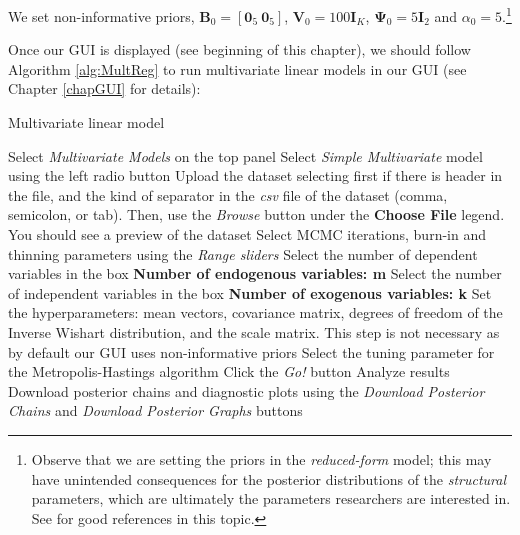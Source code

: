 We set non-informative priors, $\bm{B}_0=\left[\bm{0}_5 \ \bm{0}_5\right]$, $\bm{V}_0=100\bm{I}_K$, $\bm{\Psi}_0=5\bm{I}_2$ and $\alpha_0=5$.\footnote{Observe that we are setting the priors in the \textit{reduced-form} model; this may have unintended consequences for the posterior distributions of the \textit{structural} parameters, which are ultimately the parameters researchers are interested in. See \cite[p.~302]{koop2003bayesian} for good references in this topic.}  


Once our GUI is displayed (see beginning of this chapter), we should follow Algorithm \ref{alg:MultReg} to run multivariate linear models in our GUI (see Chapter \ref{chapGUI} for details):
\begin{algorithm}[h!]
	\caption{Multivariate linear model}\label{alg:MultReg}
	\begin{algorithmic}[1]  		 			
		\State Select \textit{Multivariate Models} on the top panel
		\State Select \textit{Simple Multivariate} model using the left radio button
		\State Upload the dataset selecting first if there is header in the file, and the kind of separator in the \textit{csv} file of the dataset (comma, semicolon, or tab). Then, use the \textit{Browse} button under the \textbf{Choose File} legend. You should see a preview of the dataset
		\State Select MCMC iterations, burn-in and thinning parameters using the \textit{Range sliders}
		\State Select the number of dependent variables in the box \textbf{Number of endogenous variables: m}
		\State Select the number of independent variables in the box \textbf{Number of exogenous variables: k}
		\State Set the hyperparameters: mean vectors, covariance matrix, degrees of freedom of the Inverse Wishart distribution, and the scale matrix. This step is not necessary as by default our GUI uses non-informative priors
		\State Select the tuning parameter for the Metropolis-Hastings algorithm
		\State Click the \textit{Go!} button
		\State Analyze results
		\State Download posterior chains and diagnostic plots using the \textit{Download Posterior Chains} and \textit{Download Posterior Graphs} buttons
	\end{algorithmic} 
\end{algorithm}

